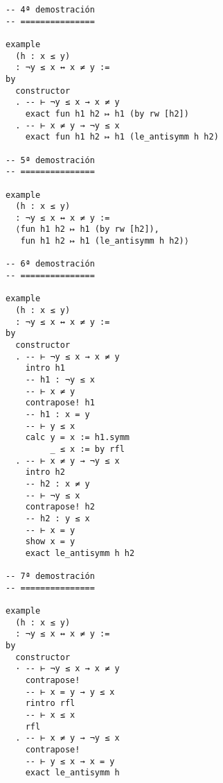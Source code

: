 \begin{verbatim}
-- 4ª demostración
-- ===============

example
  (h : x ≤ y)
  : ¬y ≤ x ↔ x ≠ y :=
by
  constructor
  . -- ⊢ ¬y ≤ x → x ≠ y
    exact fun h1 h2 ↦ h1 (by rw [h2])
  . -- ⊢ x ≠ y → ¬y ≤ x
    exact fun h1 h2 ↦ h1 (le_antisymm h h2)

-- 5ª demostración
-- ===============

example
  (h : x ≤ y)
  : ¬y ≤ x ↔ x ≠ y :=
  ⟨fun h1 h2 ↦ h1 (by rw [h2]),
   fun h1 h2 ↦ h1 (le_antisymm h h2)⟩

-- 6ª demostración
-- ===============

example
  (h : x ≤ y)
  : ¬y ≤ x ↔ x ≠ y :=
by
  constructor
  . -- ⊢ ¬y ≤ x → x ≠ y
    intro h1
    -- h1 : ¬y ≤ x
    -- ⊢ x ≠ y
    contrapose! h1
    -- h1 : x = y
    -- ⊢ y ≤ x
    calc y = x := h1.symm
         _ ≤ x := by rfl
  . -- ⊢ x ≠ y → ¬y ≤ x
    intro h2
    -- h2 : x ≠ y
    -- ⊢ ¬y ≤ x
    contrapose! h2
    -- h2 : y ≤ x
    -- ⊢ x = y
    show x = y
    exact le_antisymm h h2

-- 7ª demostración
-- ===============

example
  (h : x ≤ y)
  : ¬y ≤ x ↔ x ≠ y :=
by
  constructor
  · -- ⊢ ¬y ≤ x → x ≠ y
    contrapose!
    -- ⊢ x = y → y ≤ x
    rintro rfl
    -- ⊢ x ≤ x
    rfl
  . -- ⊢ x ≠ y → ¬y ≤ x
    contrapose!
    -- ⊢ y ≤ x → x = y
    exact le_antisymm h
\end{verbatim}

